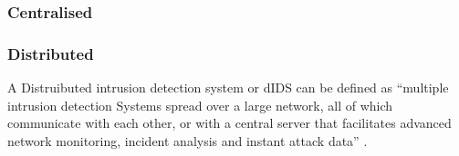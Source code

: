 \subsubsection{Centralised}

\subsubsection{Distributed}

A Distruibuted intrusion detection system or dIDS can be defined as ``multiple intrusion detection Systems spread over a large network, 
all of which communicate with each other, or with a central server that facilitates advanced network monitoring, incident analysis and instant attack data'' \citep{DIDS}.


